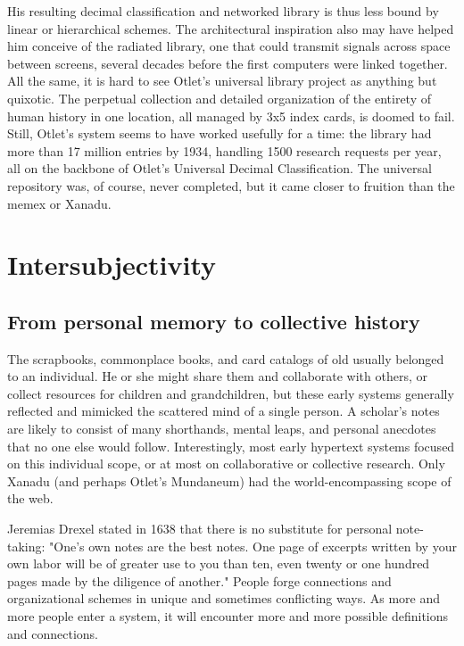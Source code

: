 His resulting decimal classification and networked library is thus less bound by linear or hierarchical schemes. The architectural inspiration also may have helped him conceive of the radiated library, one that could transmit signals across space between screens, several decades before the first computers were linked together. All the same, it is hard to see Otlet's universal library project as anything but quixotic. The perpetual collection and detailed organization of the entirety of human history in one location, all managed by 3x5 index cards, is doomed to fail. Still, Otlet's system seems to have worked usefully for a time: the library had more than 17 million entries by 1934, handling 1500 research requests per year, all on the backbone of Otlet's Universal Decimal Classification.  The universal repository was, of course, never completed, but it came closer to fruition than the memex or Xanadu.

\section{Intersubjectivity}

\subsection{From personal memory to collective history}

The scrapbooks, commonplace books, and card catalogs of old usually belonged to an individual. He or she might share them and collaborate with others, or collect resources for children and grandchildren, but these early systems generally reflected and mimicked the scattered mind of a single person. A scholar's notes are likely to consist of many shorthands, mental leaps, and personal anecdotes that no one else would follow. Interestingly, most early hypertext systems focused on this individual scope, or at most on collaborative or collective research. Only Xanadu (and perhaps Otlet's Mundaneum) had the world-encompassing scope of the web.

Jeremias Drexel stated in 1638 that there is no substitute for personal note-taking: "One's own notes are the best notes. One page of excerpts written by your own labor will be of greater use to you than ten, even twenty or one hundred pages made by the diligence of another."  People forge connections and organizational schemes in unique and sometimes conflicting ways. As more and more people enter a system, it will encounter more and more possible definitions and connections.

